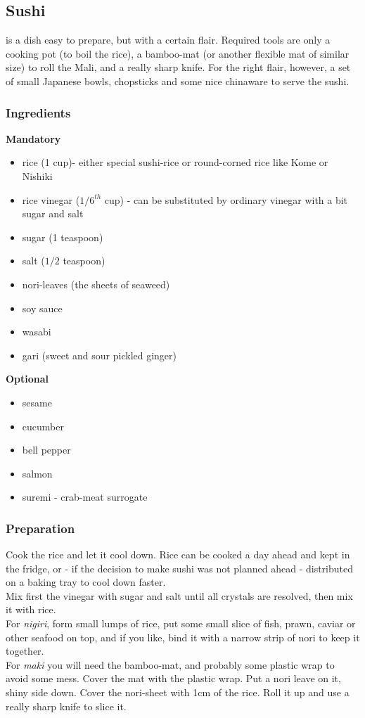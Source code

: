 \subsection{Sushi}
 is a dish easy to prepare, but with a certain flair. Required tools are only a cooking pot (to boil the rice), a bamboo-mat (or another flexible mat of similar size) to roll the Mali, and a really sharp knife. For the right flair, however, a set of small Japanese bowls, chopsticks and some nice chinaware to serve the sushi.
\subsubsection{Ingredients}
\begin{minipage}[t]{0.5\textwidth}
{\bf Mandatory}
  \begin{itemize}
  \item{rice (1 cup)- either special sushi-rice or round-corned rice like Kome or Nishiki}
  \item{rice vinegar ($1/6^{th}$ cup) - can be substituted by ordinary vinegar with a bit sugar and salt}
  \item{sugar (1 teaspoon)}
  \item{salt ($1/2$ teaspoon)}
  \item{nori-leaves (the sheets of seaweed)}
  \item{soy sauce}
  \item{wasabi}
  \item{gari (sweet and sour pickled ginger)}
  \end{itemize}
\end{minipage}
\begin{minipage}[t]{0.5\textwidth}
{\bf Optional}
  \begin{itemize}
  \item{sesame}
  \item{cucumber}
  \item{bell pepper}
  \item{salmon}
  \item{suremi - crab-meat surrogate}
  \end{itemize}
\end{minipage}
\subsubsection{Preparation}
Cook the rice and let it cool down. Rice can be cooked a day ahead and kept in the fridge, or - if the decision to make sushi was not planned ahead - distributed on a baking tray to cool down faster.\\
Mix first the vinegar with sugar and salt until all crystals are resolved, then mix it with rice.\\
For {\it nigiri}, form small lumps of rice, put some small slice of fish, prawn, caviar or other seafood on top, and if you like, bind it with a narrow strip of nori to keep it together.\\
For {\it maki} you will need the bamboo-mat, and probably some plastic wrap to avoid some mess. Cover the mat with the plastic wrap. Put a nori leave on it, shiny side down. Cover the nori-sheet with 1cm of the rice. Roll it up and use a really sharp knife to slice it.
\vfill
